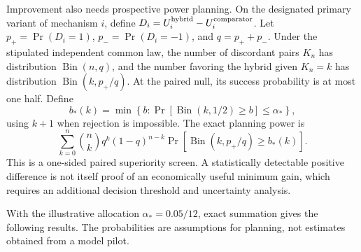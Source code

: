 Improvement also needs prospective power planning. On the designated
primary variant of mechanism \(i\), define
\(D_i=U_i^{\rm hybrid}-U_i^{\rm comparator}\). Let \(p_+=\Pr(D_i=1)\),
\(p_-=\Pr(D_i=-1)\), and \(q=p_++p_-\). Under the stipulated independent
common law, the number of discordant pairs \(K_n\) has distribution
\(\operatorname{Bin}(n,q)\), and the number favoring the hybrid given
\(K_n=k\) has distribution \(\operatorname{Bin}(k,p_+/q)\). At the
paired null, its success probability is at most one half. Define \[
 b_*(k)=\min\left\{b:
    \Pr[\operatorname{Bin}(k,1/2)\geq b]\leq\alpha_*\right\},
\] using \(k+1\) when rejection is impossible. The exact planning power
is \[
 \sum_{k=0}^{n}\binom nk q^k(1-q)^{n-k}
 \Pr[\operatorname{Bin}(k,p_+/q)\geq b_*(k)].
\] This is a one-sided paired superiority screen. A statistically
detectable positive difference is not itself proof of an economically
useful minimum gain, which requires an additional decision threshold and
uncertainty analysis.

With the illustrative allocation \(\alpha_*=0.05/12\), exact summation
gives the following results. The probabilities are assumptions for
planning, not estimates obtained from a model pilot.


